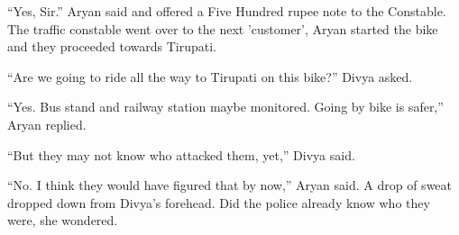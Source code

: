 “Yes, Sir.” Aryan said and offered a Five Hundred rupee note to the Constable.
The traffic constable went over to the next 'customer', Aryan started the bike
and they proceeded towards Tirupati.

“Are we going to ride all the way to Tirupati on this bike?” Divya asked.

“Yes. Bus stand and railway station maybe monitored. Going by bike is safer,”
Aryan replied.

“But they may not know who attacked them, yet,” Divya said.

“No. I think they would have figured that by now,” Aryan said. A drop of sweat
dropped down from Divya's forehead. Did the police already know who they were,
she wondered.
